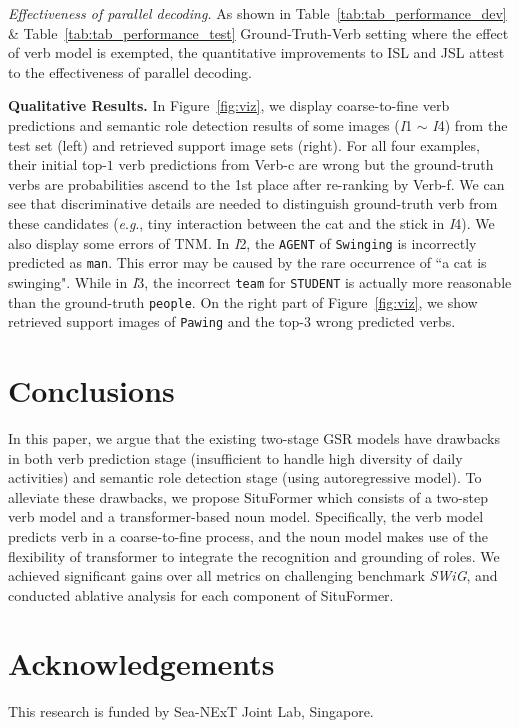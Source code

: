 \documentclass[letterpaper]{article} %
\newcommand{\eg}{\textit{e}.\textit{g}.}
\begin{document}
\noindent\emph{Effectiveness of parallel decoding.} As shown in Table~\ref{tab:tab_performance_dev} \& Table~\ref{tab:tab_performance_test} Ground-Truth-Verb setting where the effect of verb model is exempted, the quantitative improvements to ISL and JSL attest to the effectiveness of parallel decoding.

\noindent\textbf{Qualitative Results.}
In Figure~\ref{fig:viz}, we display coarse-to-fine verb predictions and semantic role detection results of some images (\textit{I}1
$\sim$ \textit{I}4) from the test set (left) and retrieved support image sets (right). For all four examples, their initial top-$1$ verb predictions from Verb-c are wrong but the ground-truth verbs are probabilities ascend to the 1st place after re-ranking by Verb-f.
We can see that discriminative details are needed to distinguish ground-truth verb from these candidates (\eg, tiny interaction between the cat and the stick in \textit{I}4).
We also display some errors of TNM.
In \textit{I}2, the \texttt{AGENT} of \texttt{Swinging} is incorrectly predicted as \texttt{man}. This error may be caused by the rare occurrence of ``a cat is swinging".
While in \textit{I}3, the incorrect \texttt{team} for \texttt{STUDENT} is actually more reasonable than the ground-truth \texttt{people}. On the right part of Figure~\ref{fig:viz}, we show retrieved support images of \texttt{Pawing} and the top-3 wrong predicted verbs.






\section{Conclusions}
In this paper, we argue that the existing two-stage GSR models have drawbacks in both verb prediction stage (insufficient to handle high diversity of daily activities) and semantic role detection stage (using autoregressive model). To alleviate these drawbacks, we propose
SituFormer which consists of a two-step verb model and a transformer-based noun model. Specifically, the verb model predicts verb in a coarse-to-fine process, and the noun model makes use of the flexibility of transformer to integrate the recognition and grounding of roles. We achieved significant gains over all metrics on challenging benchmark \textit{SWiG}, and conducted ablative analysis for each component of SituFormer.

\section{Acknowledgements}
This research is funded by Sea-NExT Joint Lab, Singapore.
\end{document}
